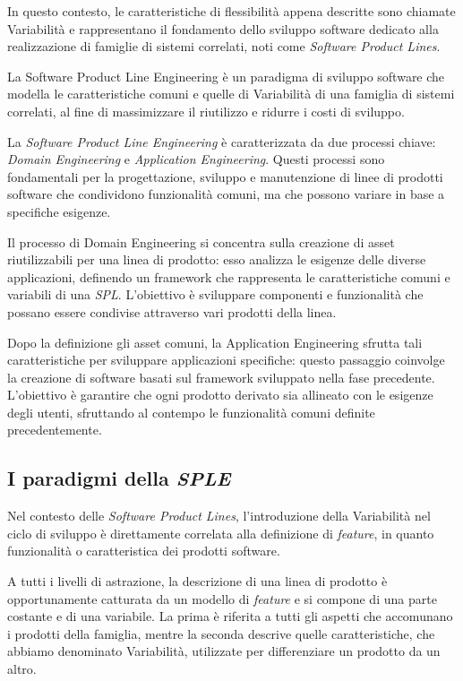\documentclass[12pt]{report}
\newcommand{\sple}{\textsl{SPLE}\xspace}
\newcommand{\spl}{\textsl{SPL}\xspace}
\begin{document}
In questo contesto, le caratteristiche di flessibilità appena descritte sono chiamate Variabilità e rappresentano il fondamento dello sviluppo software dedicato alla realizzazione di famiglie di sistemi correlati, noti come \textit{Software Product Lines}.

\begin{mdframed}
\small
La \textsf{Software Product Line Engineering} è un paradigma di sviluppo software che modella le caratteristiche comuni e quelle di Variabilità di una famiglia di sistemi correlati, al fine di massimizzare il riutilizzo e ridurre i costi di sviluppo.
\end{mdframed}

La \textit{Software Product Line Engineering} è caratterizzata da due processi chiave: \textit{Domain Engineering} e \textit{Application Engineering}. Questi processi sono fondamentali per la progettazione, sviluppo e manutenzione di linee di prodotti software che condividono funzionalità comuni, ma che possono variare in base a specifiche esigenze.

Il processo di \textsf{Domain Engineering} si concentra sulla creazione di asset riutilizzabili per una linea di prodotto: esso analizza le esigenze delle diverse applicazioni, definendo un framework che rappresenta le caratteristiche comuni e variabili di una \spl. L'obiettivo è sviluppare componenti e funzionalità che possano essere condivise attraverso vari prodotti della linea.

Dopo la definizione gli asset comuni, la \textsf{Application Engineering} sfrutta tali caratteristiche per sviluppare applicazioni specifiche: questo passaggio coinvolge la creazione di software basati sul framework sviluppato nella fase precedente. L'obiettivo è garantire che ogni prodotto derivato sia allineato con le esigenze degli utenti, sfruttando al contempo le funzionalità comuni definite precedentemente.




\subsection{I paradigmi della \sple}
Nel contesto delle \textit{Software Product Lines}, l'introduzione della Variabilità nel ciclo di sviluppo è direttamente correlata alla definizione di \textit{feature}, in quanto funzionalità o caratteristica dei prodotti software.

A tutti i livelli di astrazione, la descrizione di una linea di prodotto è opportunamente catturata da un modello di \textit{feature} e si compone di una parte costante e di una variabile. La prima è riferita a tutti gli aspetti che accomunano i prodotti della famiglia, mentre la seconda descrive quelle caratteristiche, che abbiamo denominato Variabilità, utilizzate per differenziare un prodotto da un altro.
\end{document}
